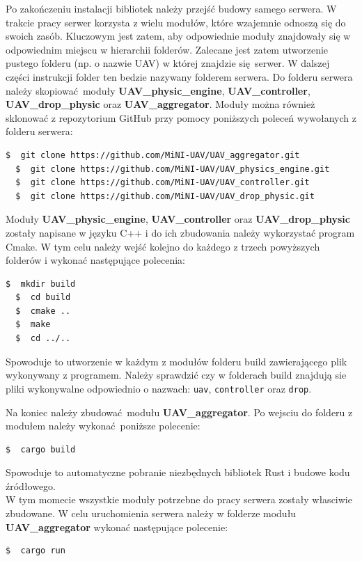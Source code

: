 \documentclass[15pt]{sprawozdanie}
\begin{document}
Po zakończeniu instalacji bibliotek należy przejść budowy samego serwera. W trakcie pracy serwer korzysta z wielu modułów, które wzajemnie odnoszą się do swoich zasób. Kluczowym jest zatem, aby odpowiednie moduły znajdowały się w odpowiednim miejscu w hierarchii folderów. Zalecane jest zatem utworzenie pustego folderu (np. o nazwie UAV) w której znajdzie się serwer. W dalszej części instrukcji folder ten bedzie nazywany folderem serwera. Do folderu serwera należy skopiować moduły \textbf{UAV\_physic\_engine}, \textbf{UAV\_controller}, \textbf{UAV\_drop\_physic} oraz \textbf{UAV\_aggregator}. Moduły można również sklonować z repozytorium GitHub przy pomocy poniższych poleceń wywołanych z folderu serwera:
\begin{lstlisting}[language=bash]
  $  git clone https://github.com/MiNI-UAV/UAV_aggregator.git 
  $  git clone https://github.com/MiNI-UAV/UAV_physics_engine.git
  $  git clone https://github.com/MiNI-UAV/UAV_controller.git
  $  git clone https://github.com/MiNI-UAV/UAV_drop_physic.git
\end{lstlisting}

Moduły \textbf{UAV\_physic\_engine}, \textbf{UAV\_controller} oraz \textbf{UAV\_drop\_physic} zostały napisane w języku C++ i do ich zbudowania należy wykorzystać program Cmake. W tym celu należy wejść kolejno do każdego z trzech powyższych folderów i wykonać następujące polecenia:
\begin{lstlisting}[language=bash]
  $  mkdir build
  $  cd build
  $  cmake ..
  $  make
  $  cd ../..
\end{lstlisting}
Spowoduje to utworzenie w każdym z modułów folderu build zawierającego plik wykonywany z programem. Należy sprawdzić czy w folderach build znajdują sie pliki wykonywalne odpowiednio o nazwach: \texttt{uav}, \texttt{controller} oraz \texttt{drop}.

Na koniec należy zbudować modułu \textbf{UAV\_aggregator}. Po wejsciu do folderu z modułem należy wykonać poniższe polecenie:
\begin{lstlisting}[language=bash]
  $  cargo build
\end{lstlisting}
Spowoduje to automatyczne pobranie niezbędnych bibliotek Rust i budowe kodu źródłowego.\\

W tym momecie wszystkie moduły potrzebne do pracy serwera zostały własciwie zbudowane. W celu uruchomienia serwera należy w folderze modułu\\ \textbf{UAV\_aggregator} wykonać następujące polecenie:
\begin{lstlisting}[language=bash]
  $  cargo run
\end{lstlisting}
\end{document}
